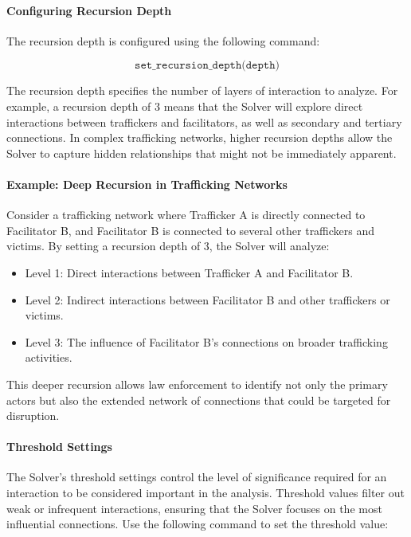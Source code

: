 \documentclass[%
 preprint, linenumbers,
 amsmath,amssymb,
 aps, physrev,
]{revtex4-2}
\begin{document}
\paragraph{Configuring Recursion Depth}
The recursion depth is configured using the following command:

\[
\texttt{set\_recursion\_depth(depth)}
\]

The recursion depth specifies the number of layers of interaction to analyze. For example, a recursion depth of 3 means that the Solver will explore direct interactions between traffickers and facilitators, as well as secondary and tertiary connections. In complex trafficking networks, higher recursion depths allow the Solver to capture hidden relationships that might not be immediately apparent.

\paragraph{Example: Deep Recursion in Trafficking Networks}
Consider a trafficking network where Trafficker A is directly connected to Facilitator B, and Facilitator B is connected to several other traffickers and victims. By setting a recursion depth of 3, the Solver will analyze:

\begin{itemize}
    \item Level 1: Direct interactions between Trafficker A and Facilitator B.
    \item Level 2: Indirect interactions between Facilitator B and other traffickers or victims.
    \item Level 3: The influence of Facilitator B’s connections on broader trafficking activities.
\end{itemize}

This deeper recursion allows law enforcement to identify not only the primary actors but also the extended network of connections that could be targeted for disruption.

\paragraph{Threshold Settings}
The Solver’s threshold settings control the level of significance required for an interaction to be considered important in the analysis. Threshold values filter out weak or infrequent interactions, ensuring that the Solver focuses on the most influential connections. Use the following command to set the threshold value:
\end{document}
